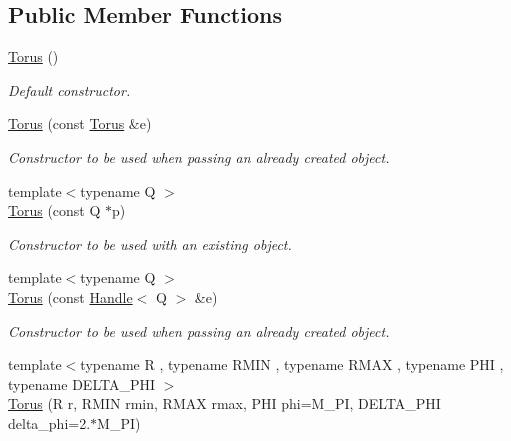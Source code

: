 \subsection*{Public Member Functions}
\begin{DoxyCompactItemize}
\item 
\hyperlink{class_d_d4hep_1_1_geometry_1_1_torus_a6ad2df832a95cb0dd9868a035c25da33}{Torus} ()
\begin{DoxyCompactList}\small\item\em Default constructor. \item\end{DoxyCompactList}\item 
\hyperlink{class_d_d4hep_1_1_geometry_1_1_torus_afc112d71d974aa148df42a03b11d5bee}{Torus} (const \hyperlink{class_d_d4hep_1_1_geometry_1_1_torus}{Torus} \&e)
\begin{DoxyCompactList}\small\item\em Constructor to be used when passing an already created object. \item\end{DoxyCompactList}\item 
{\footnotesize template$<$typename Q $>$ }\\\hyperlink{class_d_d4hep_1_1_geometry_1_1_torus_a1e0d5fc81c65852ca86ec2c21adf6898}{Torus} (const Q $\ast$p)
\begin{DoxyCompactList}\small\item\em Constructor to be used with an existing object. \item\end{DoxyCompactList}\item 
{\footnotesize template$<$typename Q $>$ }\\\hyperlink{class_d_d4hep_1_1_geometry_1_1_torus_ac2a170ba695a63bc60e281fbc292b0bd}{Torus} (const \hyperlink{class_d_d4hep_1_1_handle}{Handle}$<$ Q $>$ \&e)
\begin{DoxyCompactList}\small\item\em Constructor to be used when passing an already created object. \item\end{DoxyCompactList}\item 
{\footnotesize template$<$typename R , typename RMIN , typename RMAX , typename PHI , typename DELTA\_\-PHI $>$ }\\\hyperlink{class_d_d4hep_1_1_geometry_1_1_torus_aec91460f3c330cfeb2bf5548bde1fe31}{Torus} (R r, RMIN rmin, RMAX rmax, PHI phi=M\_\-PI, DELTA\_\-PHI delta\_\-phi=2.$\ast$M\_\-PI)

\end{DoxyCompactItemize}
